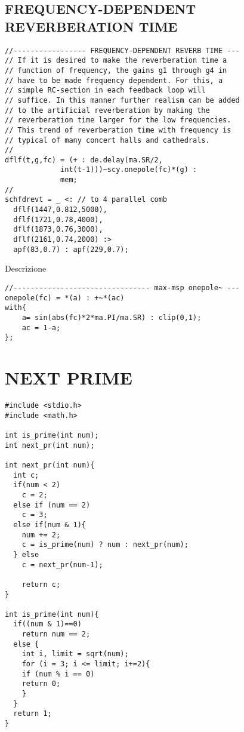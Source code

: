 \subsection*{FREQUENCY-DEPENDENT REVERBERATION TIME}
\begin{lstlisting}
//----------------- FREQUENCY-DEPENDENT REVERB TIME ---
// If it is desired to make the reverberation time a
// function of frequency, the gains g1 through g4 in
// have to be made frequency dependent. For this, a
// simple RC-section in each feedback loop will
// suffice. In this manner further realism can be added
// to the artificial reverberation by making the
// reverberation time larger for the low frequencies.
// This trend of reverberation time with frequency is
// typical of many concert halls and cathedrals.
//
dflf(t,g,fc) = (+ : de.delay(ma.SR/2,
             int(t-1)))~scy.onepole(fc)*(g) :
             mem;
//
schfdrevt = _ <: // to 4 parallel comb
  dflf(1447,0.812,5000),
  dflf(1721,0.78,4000),
  dflf(1873,0.76,3000),
  dflf(2161,0.74,2000) :>
  apf(83,0.7) : apf(229,0.7);
\end{lstlisting}

Descrizione

\begin{lstlisting}
//-------------------------------- max-msp onepole~ ---
onepole(fc) = *(a) : +~*(ac)
with{
    a= sin(abs(fc)*2*ma.PI/ma.SR) : clip(0,1);
    ac = 1-a;
};
\end{lstlisting}

\section*{NEXT PRIME}
\begin{lstlisting}
#include <stdio.h>
#include <math.h>

int is_prime(int num);
int next_pr(int num);

int next_pr(int num){
  int c;
  if(num < 2)
    c = 2;
  else if (num == 2)
    c = 3;
  else if(num & 1){
    num += 2;
    c = is_prime(num) ? num : next_pr(num);
  } else
    c = next_pr(num-1);

    return c;
}

int is_prime(int num){
  if((num & 1)==0)
    return num == 2;
  else {
    int i, limit = sqrt(num);
    for (i = 3; i <= limit; i+=2){
    if (num % i == 0)
    return 0;
    }
  }
  return 1;
}
\end{lstlisting}

